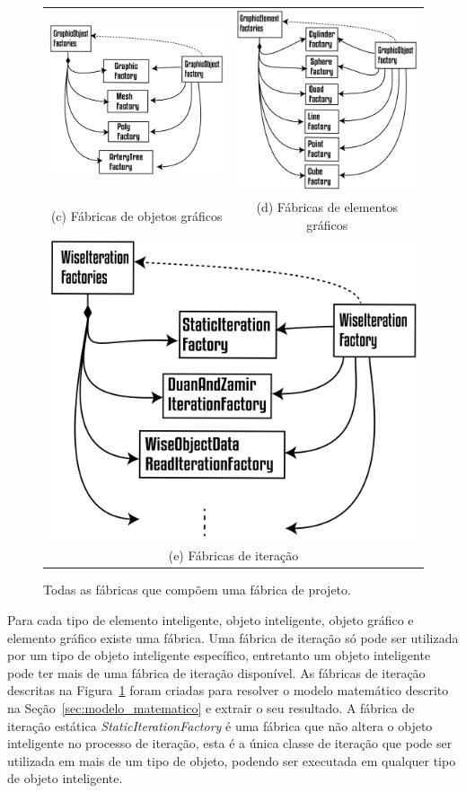 \documentclass[a4paper,12pt]{monografia}
\theoremstyle{plain}
\theoremstyle{definition}
\theoremstyle{remark}
\begin{document}
\begin{figure}
\begin{tabular}{cc}
		\includegraphics[width=0.5\linewidth]{Figures/GraphicObjectFactories@16x.png} &   \includegraphics[width=0.5\linewidth]{Figures/GraphicElementFactories@16x.png} \\
		(c) Fábricas de objetos gráficos & (d) Fábricas de elementos gráficos \\[6pt]
		\multicolumn{2}{c}{\includegraphics[width=0.5\linewidth]{Figures/WiseIterationFactories@16x.png} }\\
		\multicolumn{2}{c}{(e) Fábricas de iteração}
	\end{tabular}
	\caption{Todas as fábricas que compõem uma fábrica de projeto.}
	\label{tab:factories} 
\end{figure}

Para cada tipo de elemento inteligente, objeto inteligente, objeto gráfico e elemento gráfico existe uma fábrica. Uma fábrica de iteração só pode ser utilizada por um tipo de objeto inteligente específico, entretanto um objeto inteligente pode ter mais de uma fábrica de iteração disponível. As fábricas de iteração descritas na Figura~\ref{tab:factories} foram criadas para resolver o modelo matemático descrito na Seção~\ref{sec:modelo_matematico} e extrair o seu resultado. A fábrica de iteração estática \textit{StaticIterationFactory} é uma fábrica que não altera o objeto inteligente no processo de iteração, esta é a única classe de iteração que pode ser utilizada em mais de um tipo de objeto, podendo ser executada em qualquer tipo de objeto inteligente.
\end{document}
